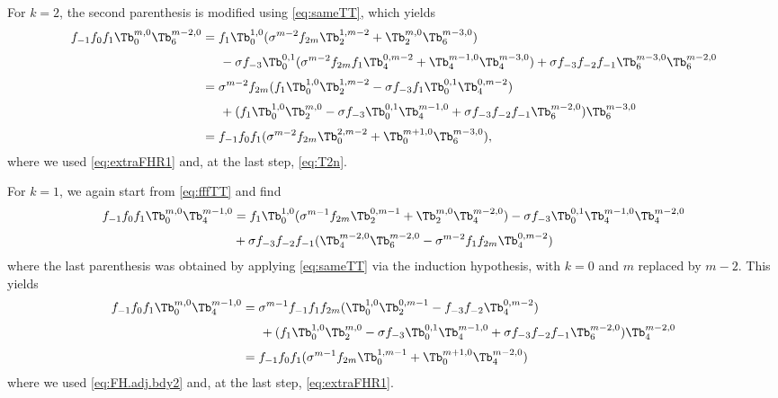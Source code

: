 \documentclass[11pt]{article}
\numberwithin{equation}{section}
\theoremstyle{plain}
\numberwithin{equation}{section}
\begin{document}
For $k=2$, the second parenthesis is modified using \eqref{eq:sameTT}, which yields
\begin{alignat}{2}
f_{-1}f_0f_1\Tb^{m,0}_0 \Tb^{m-2,0}_{6} &= f_1\Tb^{1,0}_0 (\sigma^{m-2}f_{2m} \Tb^{1,m-2}_2 + \Tb^{m,0}_2 \Tb^{m-3,0}_{6}) 
\nonumber\\[0.1cm]&\hspace{0.5cm}
- \sigma f_{-3} \Tb^{0,1}_0(\sigma^{m-2}f_{2m}f_1 \Tb^{0,m-2}_4 + \Tb^{m-1,0}_4 \Tb^{m-3,0}_{4}) 
+ \sigma f_{-3}f_{-2}f_{-1} \Tb^{m-3,0}_6\Tb^{m-2,0}_6
\nonumber\\[0.1cm]
& = \sigma^{m-2} f_{2m} (f_1\Tb^{1,0}_0\Tb^{1,m-2}_2 - \sigma f_{-3}f_1\Tb^{0,1}_0 \Tb^{0,m-2}_4) \nonumber\\[0.1cm]&\hspace{0.5cm}
+ (f_1\Tb^{1,0}_0\Tb^{m,0}_2 - \sigma f_{-3} \Tb^{0,1}_0\Tb^{m-1,0}_4+\sigma f_{-3}f_{-2}f_{-1}\Tb^{m-2,0}_6)\Tb^{m-3,0}_{6}
\nonumber\\[0.1cm]&=f_{-1}f_0f_1(\sigma^{m-2}f_{2m} \Tb^{2,m-2}_0 + \Tb^{m+1,0}_0\Tb^{m-3,0}_{6}),
\end{alignat}
where we used \eqref{eq:extraFHR1} and, at the last step, \eqref{eq:T2n}.

For $k=1$, we again start from \eqref{eq:fffTT} and find
\begin{alignat}{2}
f_{-1}f_0f_1\Tb^{m,0}_0 \Tb^{m-1,0}_4 &= f_1\Tb^{1,0}_0 (\sigma^{m-1}f_{2m} \Tb^{0,m-1}_2 + \Tb^{m,0}_2 \Tb^{m-2,0}_4) 
- \sigma f_{-3} \Tb^{0,1}_0\Tb^{m-1,0}_4\Tb^{m-2,0}_4\nonumber\\[0.1cm]&
+ \sigma f_{-3}f_{-2}f_{-1} (\Tb^{m-2,0}_4\Tb^{m-2,0}_6-\sigma^{m-2}f_1 f_{2m}\Tb^{0,m-2}_4)
\end{alignat}
where the last parenthesis was obtained by applying \eqref{eq:sameTT} via the induction hypothesis, with $k=0$ and $m$ replaced by $m-2$. This yields
\begin{alignat}{2}
f_{-1}f_0f_1\Tb^{m,0}_0 \Tb^{m-1,0}_4 &= \sigma^{m-1}f_{-1}f_1f_{2m} (\Tb^{1,0}_0 \Tb^{0,m-1}_2 - f_{-3}f_{-2}\Tb^{0,m-2}_4)
\nonumber\\[0.1cm]
&\hspace{0.5cm}+ (f_1\Tb^{1,0}_0\Tb^{m,0}_2 - \sigma f_{-3} \Tb^{0,1}_0\Tb^{m-1,0}_4+\sigma f_{-3} f_{-2} f_{-1} \Tb^{m-2,0}_6)\Tb^{m-2,0}_4
\nonumber\\[0.1cm]
& = f_{-1}f_0f_1 (\sigma^{m-1}f_{2m}\Tb^{1,m-1}_0 + \Tb^{m+1,0}_0 \Tb^{m-2,0}_4)
\end{alignat}
where we used \eqref{eq:FH.adj.bdy2} and, at the last step, \eqref{eq:extraFHR1}.
\end{document}
